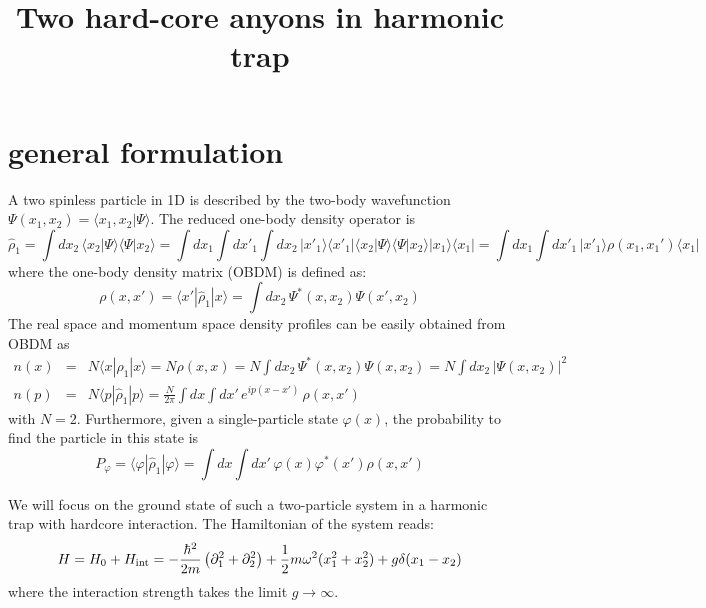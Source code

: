\documentclass[onecolumn,english,aps,pra]{revtex4}
\begin{document}
\title{Two hard-core anyons in harmonic trap}


\maketitle
 
\section{general formulation}
A two spinless particle in 1D is described by the two-body wavefunction $\Psi(x_1,x_2)=\langle x_1,x_2|\Psi \rangle$. The reduced one-body density operator is \[ \hat{\rho}_1 = \int dx_2\, \langle x_2| \Psi \rangle \langle \Psi |x_2 \rangle = \int dx_1 \int dx'_1 \int dx_2\, |x'_1\rangle \langle x'_1| \langle x_2| \Psi \rangle \langle \Psi |x_2 \rangle  |x_1\rangle \langle x_1| = \int dx_1 \int dx'_1 \, |x'_1\rangle \rho(x_1,x_1') \langle x_1|   \]  where the one-body density matrix (OBDM) is defined as:
\[ \rho(x,x')= \langle x'|\hat{\rho}_1| x \rangle = \int dx_2 \, \Psi^*(x,x_2) \Psi(x',x_2) \]
The real space and momentum space density profiles can be easily obtained from OBDM as
\begin{eqnarray}
	n(x) &=& N \langle x| \hat{\rho}_1 |x \rangle = N \rho(x,x) = N \int dx_2 \, \Psi^*(x,x_2) \Psi(x,x_2) = N \int dx_2 \, |\Psi(x,x_2)|^2   \\
	n(p) &=& N \langle p| \hat{\rho}_1 |p \rangle =\frac{N}{2\pi} \int dx \int dx' \,e^{ip(x-x')}\, \rho(x,x')
	\end{eqnarray}
with $N=2$. Furthermore, given a single-particle state $\varphi(x)$, the probability to find the particle in this state is \[  P_\varphi = \langle \varphi| \hat{\rho}_1 |\varphi \rangle= \int dx \int dx' \,\varphi(x) \varphi^*(x') \rho(x,x') \] 	

We will focus on the ground state of such a two-particle system in a harmonic trap with hardcore interaction. The Hamiltonian of the system reads:
\[ H =H_0+H_{\rm int}= -\frac{\hbar^2}{2m} \left( \partial_1^2 + \partial_2^2 \right) + \frac{1}{2} m\omega^2 (x_1^2+x_2^2) + g\delta(x_1-x_2)  \] where the interaction strength takes the limit $g \longrightarrow \infty$.
\end{document}
